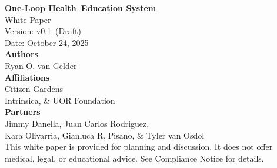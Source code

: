 \documentclass[12pt]{article}
\newcommand{\papertitle}{One-Loop Health–Education System}
\newcommand{\paperversion}{v0.1 \,(Draft)}
\newcommand{\paperdate}{October 24, 2025}
\newcommand{\paperauthors}{Ryan O. van Gelder}
\newcommand{\paperaffiliations}{Citizen Gardens \\ Intrinsica, \& UOR Foundation}
\newcommand{\paperpartners}{Jimmy Danella, Juan Carlos Rodriguez, \\ Kara Olivarria, Gianluca R. Pisano, \& Tyler van Osdol}
\begin{document}
\begin{titlepage}
  \centering
  {\LARGE \bfseries \papertitle\\[0.75em]}
  {\large White Paper}\\[2em]

  {\large Version: \paperversion}\\
  {\large Date: \paperdate}\\[2em]

  {\normalsize \textbf{Authors}}\\
  {\normalsize \paperauthors}\\[0.75em]

  {\normalsize \textbf{Affiliations}}\\
  {\normalsize \paperaffiliations}\\[0.75em]

  {\normalsize \textbf{Partners}}\\
  {\normalsize \paperpartners}\\[3em]


  \vfill
  {\footnotesize This white paper is provided for planning and discussion. It does not offer medical, legal, or educational advice. See Compliance Notice for details.}
\end{titlepage}
\end{document}
